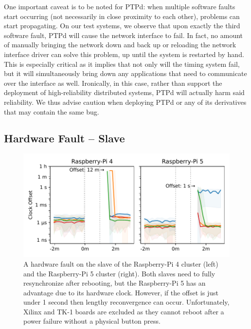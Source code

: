 One important caveat is to be noted for PTPd: when multiple software faults start occurring (not necessarily in close proximity to each other), problems can start propagating. On our test systems, we observe that upon exactly the third software fault, PTPd will cause the network interface to fail. In fact, no amount of manually bringing the network down and back up or reloading the network interface driver can solve this problem, up until the system is restarted by hand. This is especially critical as it implies that not only will the timing system fail, but it will simultaneously bring down any applications that need to communicate over the interface as well. Ironically, in this case, rather than support the deployment of high-reliability distributed systems, PTPd will actually harm said reliability. We thus advise caution when deploying PTPd or any of its derivatives that may contain the same bug.

\subsection{Hardware Fault -- Slave}
\xdef\maxPiFour{\cmpMax}

\xdef\maxPiFive{\cmpMax}


\begin{figure}
    \centering
    \includegraphics[width=\linewidth]{res/generated/fault/hardware/slave_cluster_comparison.pdf}
    \legend
    \caption{A hardware fault on the slave of the Raspberry-Pi 4 cluster (left) and the Raspberry-Pi 5 cluster (right). Both slaves need to fully resynchronize after rebooting, but the Raspberry-Pi 5 has an advantage due to its hardware clock. However, if the offset is just under 1 second then lengthy reconvergence can occur. Unfortunately, Xilinx and TK-1 boards are excluded as they cannot reboot after a power failure without a physical button press.}
    \label{fig:hardware_fault_slave}
\end{figure}

